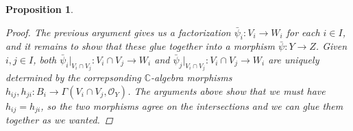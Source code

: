 \documentclass[12pt,a4paper]{amsart}
\theoremstyle{plain}
\newtheorem{prop}[thm]{Proposition}
\theoremstyle{definition}
\theoremstyle{remark}
\begin{document}
\begin{prop}
\begin{proof}
    The previous argument gives us a factorization $\bar{\psi}_{i} \colon V_{i} \to W_{i}$ for each $i \in I$, and it remains to show that these glue together into a morphism $\bar{\psi} \colon Y \to Z$.
    Given $i, j \in I$, both $\bar{\psi}_{i}|_{V_{i} \cap V_{j}} \colon V_{i} \cap V_{j} \to W_{i}$ and $\bar{\psi}_{j}|_{V_{i} \cap V_{j}} \colon V_{i} \cap V_{j} \to W_{i}$ are uniquely determined by the correpsonding $\mathbb{C}$-algebra morphisms $h_{ij} , h_{ji} \colon B_{i} \to \Gamma(V_{i} \cap V_{j}, \mathscr{O}_{Y})$.
    The arguments above show that we must have $h_{ij} = h_{ji}$, so the two morphisms agree on the intersections and we can glue them together as we wanted.

  \end{proof}
\end{prop}
\end{document}
